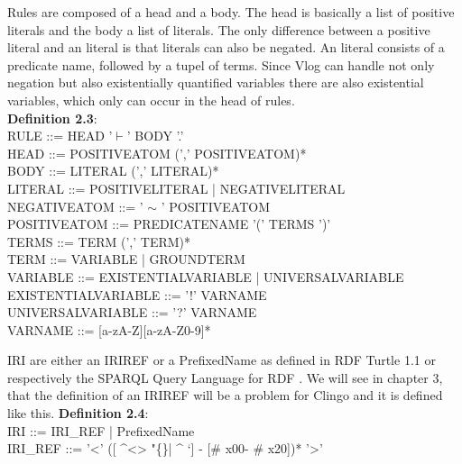 \documentclass[hyperref, bachelorofscience]{cgvpub}
\renewenvironment{shaded}{%
  \def\FrameCommand{\fboxsep=\FrameSep \colorbox{shadecolor}}%
  \MakeFramed{\advance\hsize-\width \FrameRestore\FrameRestore}}%
 {\endMakeFramed}
\begin{document}
Rules are composed of a head and a body. The head is basically a list of positive literals and the body a list of literals. The only difference between a positive literal and an literal is that literals can also be negated.
An literal consists of a predicate name, followed by a tupel of terms. Since Vlog can handle not only negation but also existentially quantified variables there are also existential variables, which only can occur in the head of rules.\\
\begin{shaded}
\textbf{Definition 2.3}: \\
RULE                   ::= HEAD '$\vdash$' BODY '.' \\
HEAD                   ::= POSITIVEATOM (',' POSITIVEATOM)*\ \\
BODY                   ::= LITERAL (',' LITERAL)* \\
LITERAL                   ::= POSITIVELITERAL | NEGATIVELITERAL \\
NEGATIVEATOM           ::= ' $\mathord{\sim}$ ' POSITIVEATOM  \\
POSITIVEATOM           ::= PREDICATENAME '(' TERMS ')' \\
TERMS                  ::= TERM (',' TERM)* \\
TERM                   ::= VARIABLE | GROUNDTERM \\
VARIABLE               ::= EXISTENTIALVARIABLE | UNIVERSALVARIABLE \\
EXISTENTIALVARIABLE    ::= '!' VARNAME \\
UNIVERSALVARIABLE      ::= '?' VARNAME \\
VARNAME                ::= [a-zA-Z][a-zA-Z0-9]* 
\end{shaded}

IRI are either an IRIREF or a PrefixedName as defined in RDF Turtle 1.1 \cite{PCBT2014} or respectively the SPARQL Query Language for RDF \cite{PS2008}. 
We will see in chapter 3, that the definition of an IRIREF will be a problem for Clingo and it is defined like this.
\begin{shaded}
\textbf{Definition 2.4}: \\
IRI ::= IRI\_REF | PrefixedName \\
IRI\_REF	  ::=  '<' ([ \string^<> "\{\}| \string^ `] - [\# x00- \# x20])* '>' %
\end{shaded}
\end{document}
